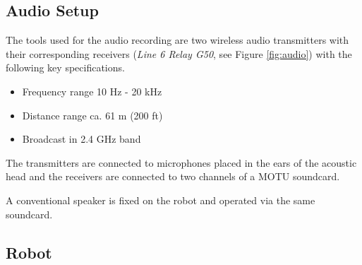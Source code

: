\subsection{Audio Setup}
The tools used for the audio recording are two wireless audio transmitters with their corresponding 
receivers (\textit{Line 6 Relay G50}, see Figure \ref{fig:audio}) 
with the following key specifications.

\begin{itemize}
    \item Frequency range 10 Hz - 20 kHz
    \item Distance range ca. 61 m (200 ft)
    \item Broadcast in 2.4 GHz band
\end{itemize}

The transmitters are connected to microphones placed in the ears of the acoustic head and the receivers are connected to two channels of a MOTU soundcard.


A conventional speaker is fixed on the robot and operated via the same soundcard. 
\subsection{Robot}

